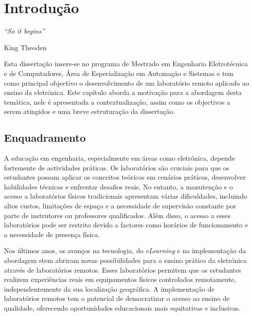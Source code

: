
\chapter{Introdução} 	%
\label{Capítulo1} 		%

\begin{center}
    \textit{``So it begins''}
     
     King Theoden
\end{center}

Esta dissertação insere-se no programa de Mestrado em Engenharia Eletrotécnica e de Computadores, Área de Especialização em Automação e Sistemas e tem como principal objectivo o desenvolvimento de um \acrfull{laboratório remoto} aplicado ao ensino da eletrónica.
Este capítulo aborda a motivação para a abordagem desta temática, nele é apresentada a contextualização, assim como os objectivos a serem atingidos e uma breve estruturação da dissertação.

\section{Enquadramento}
\label{sec: Enquadramento}
A educação em engenharia, especialmente em áreas como eletrónica, depende fortemente de actividades práticas. Os laboratórios são cruciais para que os estudantes possam aplicar os conceitos teóricos em cenários práticos, desenvolver habilidades técnicas e enfrentar desafios reais\cite{Hofstein}\cite{BRINSON2015218}. No entanto, a manutenção e o acesso a laboratórios físicos tradicionais apresentam várias dificuldades, incluindo altos custos, limitações de espaço e a necessidade de supervisão constante por parte de instrutores ou professores qualificados\cite{feisel}. Além disso, o acesso a esses laboratórios pode ser restrito devido a factores como horários de funcionamento e a necessidade de presença física.

Nos últimos anos, os avanços na tecnologia, do \textit{eLearning} e na implementação da abordagem \acrfull{stem} abriram novas possibilidades para o ensino prático da eletrónica através de laboratórios remotos. Esses laboratórios permitem que os estudantes realizem experiências reais em equipamentos físicos controlados remotamente, independentemente da sua localização geográfica. A implementação de laboratórios remotos tem o potencial de democratizar o acesso ao ensino de qualidade, oferecendo oportunidades educacionais mais equitativas e inclusivas\cite{CORTER20112054}.

